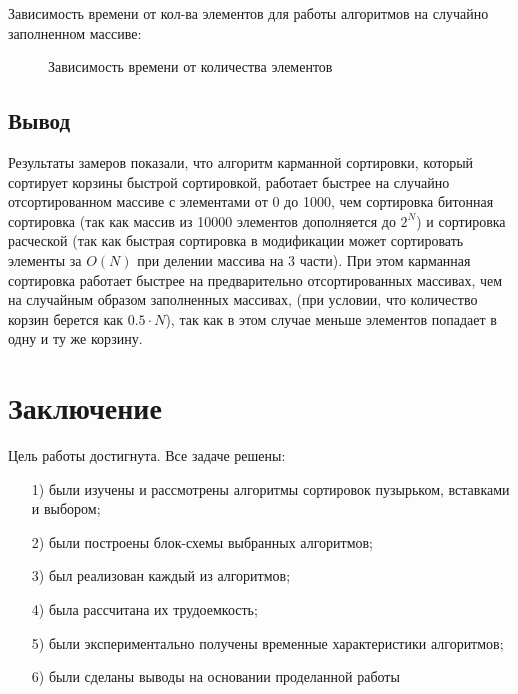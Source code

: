 \documentclass[12pt]{report}
\begin{document}
	Зависимость времени от кол-ва элементов для работы алгоритмов на случайно заполненном массиве:
	
	\begin{center}
		\begin{figure}[H]
		\center
		\caption{Зависимость времени от количества элементов}
		\end{figure}
	\end{center}
	

	\section*{Вывод}
	
	Результаты замеров показали, что алгоритм карманной сортировки, который сортирует корзины быстрой сортировкой, работает быстрее на случайно отсортированном массиве с элементами от 0 до 1000, чем сортировка битонная сортировка  (так как массив из 10000 элементов дополняется до $2^N$) и сортировка расческой (так как быстрая сортировка в модификации может сортировать элементы за $O(N)$ при делении массива на 3 части). При этом карманная сортировка работает быстрее на предварительно отсортированных массивах, чем на случайным образом заполненных массивах, (при условии, что количество корзин берется как $0.5 \cdot N$), так как в этом случае меньше элементов попадает в одну и ту же корзину. 
	
	\chapter*{Заключение}
	
	Цель работы достигнута. Все задаче решены:
	
	\begin{enumerate}
		\item[1)] были изучены и рассмотрены алгоритмы сортировок пузырьком, вставками и выбором;
		\item[2)] были построены блок-схемы выбранных алгоритмов;
		\item[3)] был реализован каждый из алгоритмов;
		\item[4)] была рассчитана их трудоемкость;
		\item[5)] были экспериментально получены временные характеристики алгоритмов;
		\item[6)] были сделаны выводы на основании проделанной работы
	\end{enumerate}
	
\end{document}
